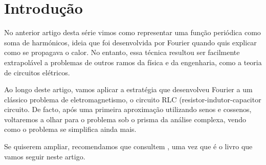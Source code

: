 \section{Introdução}
No anterior artigo desta série vimos como representar uma função
periódica como soma de harmónicos, ideia que foi desenvolvida por
Fourier quando quis explicar como se propagava o calor. No entanto,
essa técnica resultou ser facilmente extrapolável a problemas de
outros ramos da física e da engenharia, como a teoria de circuitos
elétricos.

Ao longo deste artigo, vamos aplicar a estratégia que desenvolveu
Fourier a um clássico problema de eletromagnetismo, o circuito RLC
(resistor-indutor-capacitor circuito. De facto, após uma primeira
aproximação utilizando senos e cossenos, voltaremos a olhar para o
problema sob o prisma da análise complexa, vendo como o problema se
simplifica ainda mais.

Se quiserem ampliar, recomendamos que consultem \cite{Sadiku}, uma vez
que é o livro que vamos seguir neste artigo.

